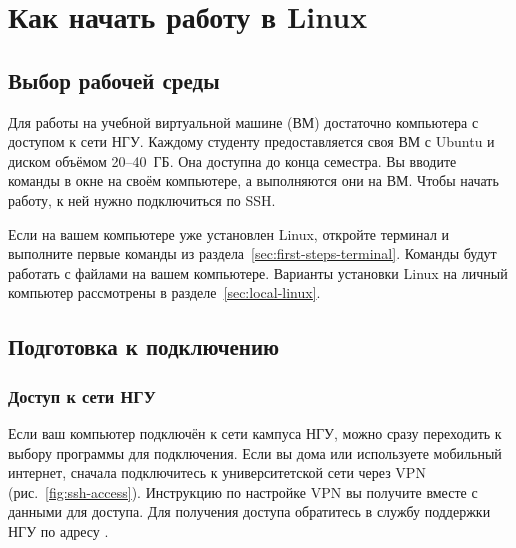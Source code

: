 \chapter{Как начать работу в Linux}
\label{ch:02-linux-access}

\section{Выбор рабочей среды}

Для работы на учебной виртуальной машине (ВМ) достаточно компьютера
с доступом к сети НГУ. Каждому студенту предоставляется своя ВМ с Ubuntu
и диском объёмом 20--40~ГБ. Она доступна до конца семестра.
Вы вводите команды в окне на своём компьютере, а выполняются они на ВМ.
Чтобы начать работу, к ней нужно подключиться по SSH.

Если на вашем компьютере уже установлен Linux, откройте терминал и
выполните первые команды из раздела~\ref{sec:first-steps-terminal}.
Команды будут работать с файлами на вашем компьютере. Варианты установки
Linux на личный компьютер рассмотрены в разделе~\ref{sec:local-linux}.

\section{Подготовка к подключению}

\subsection{Доступ к сети НГУ}

Если ваш компьютер подключён к сети кампуса НГУ, можно сразу переходить
к выбору программы для подключения. Если вы дома или используете
мобильный интернет, сначала подключитесь к университетской сети через
VPN (рис.~\ref{fig:ssh-access}). Инструкцию по настройке VPN вы получите
вместе с данными для доступа. Для получения доступа обратитесь
в службу поддержки НГУ по адресу .

\begin{center}
\begin{minipage}{\linewidth}
\captionsetup{type=figure}
\centering
{}
\caption{Два способа подключения к учебной ВМ}
\label{fig:ssh-access}
\end{minipage}
\end{center}

